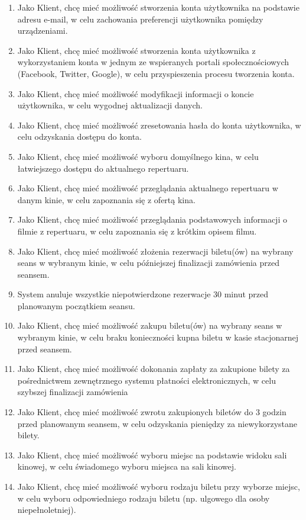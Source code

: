 \begin{enumerate}
\item Jako Klient, chcę mieć możliwość stworzenia konta użytkownika na podstawie adresu e-mail, w celu zachowania preferencji użytkownika pomiędzy urządzeniami.
\item Jako Klient, chcę mieć możliwość stworzenia konta użytkownika z wykorzystaniem konta w jednym ze wspieranych portali społecznościowych (Facebook, Twitter, Google), w celu przyspieszenia procesu tworzenia konta.
\item Jako Klient, chcę mieć możliwość modyfikacji informacji o koncie użytkownika, w celu wygodnej aktualizacji danych.
\item Jako Klient, chcę mieć możliwość zresetowania hasła do konta użytkownika, w celu odzyskania dostępu do konta. 
\item Jako Klient, chcę mieć możliwość wyboru domyślnego kina, w celu łatwiejszego dostępu do aktualnego repertuaru.
\item Jako Klient, chcę mieć możliwość przeglądania aktualnego repertuaru w danym kinie, w celu zapoznania się z ofertą kina.
\item Jako Klient, chcę mieć możliwość przeglądania podstawowych informacji o filmie z repertuaru, w celu zapoznania się z krótkim opisem filmu. 
\item Jako Klient, chcę mieć możliwość złożenia rezerwacji biletu(ów) na wybrany seans w wybranym kinie, w celu późniejszej finalizacji zamówienia przed seansem.
\item System anuluje wszystkie niepotwierdzone rezerwacje 30 minut przed planowanym początkiem seansu. 
\item Jako Klient, chcę mieć możliwość zakupu biletu(ów) na wybrany seans w wybranym kinie, w celu braku konieczności kupna biletu w kasie stacjonarnej przed seansem.
\item Jako Klient, chcę mieć możliwość dokonania zapłaty za zakupione bilety za pośrednictwem zewnętrznego systemu płatności elektronicznych, w celu szybszej finalizacji zamówienia
\item Jako Klient, chcę mieć możliwość zwrotu zakupionych biletów do 3 godzin przed planowanym seansem, w celu odzyskania pieniędzy za niewykorzystane bilety.
\item Jako Klient, chcę mieć możliwość wyboru miejsc na podstawie widoku sali kinowej, w celu świadomego wyboru miejsca na sali kinowej.
\item Jako Klient, chcę mieć możliwość wyboru rodzaju biletu przy wyborze miejsc, w celu wyboru odpowiedniego rodzaju biletu (np. ulgowego dla osoby niepełnoletniej).

\end{enumerate}
